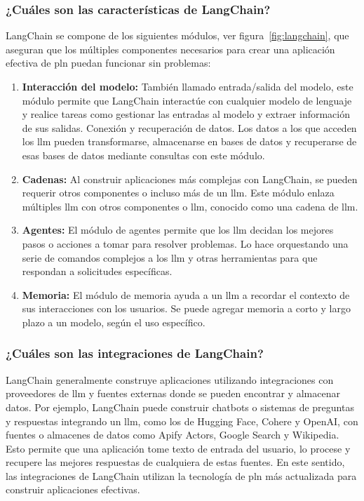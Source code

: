 \subsubsection{¿Cuáles son las características de LangChain?}
LangChain se compone de los siguientes módulos, ver figura~\ref{fig:langchain}, que aseguran que los múltiples componentes necesarios para crear una aplicación efectiva de \acrshort{pln} puedan funcionar sin problemas:
\begin{enumerate}

\item \textbf{Interacción del modelo:} También llamado entrada/salida del modelo, este módulo permite que LangChain interactúe con cualquier modelo de lenguaje y realice tareas como gestionar las entradas al modelo y extraer información de sus salidas.
Conexión y recuperación de datos. Los datos a los que acceden los \acrshort{llm} pueden transformarse, almacenarse en bases de datos y recuperarse de esas bases de datos mediante consultas con este módulo.
\item \textbf{Cadenas:} Al construir aplicaciones más complejas con LangChain, se pueden requerir otros componentes o incluso más de un \acrshort{llm}. Este módulo enlaza múltiples \acrshort{llm} con otros componentes o \acrshort{llm}, conocido como una cadena de \acrshort{llm}.
\item \textbf{Agentes:} El módulo de agentes permite que los \acrshort{llm} decidan los mejores pasos o acciones a tomar para resolver problemas. Lo hace orquestando una serie de comandos complejos a los \acrshort{llm} y otras herramientas para que respondan a solicitudes específicas.
\item \textbf{Memoria:} El módulo de memoria ayuda a un \acrshort{llm} a recordar el contexto de sus interacciones con los usuarios. Se puede agregar memoria a corto y largo plazo a un modelo, según el uso específico.
\end{enumerate}


\subsubsection{¿Cuáles son las integraciones de LangChain?}
LangChain generalmente construye aplicaciones utilizando integraciones con proveedores de \acrshort{llm} y fuentes externas donde se pueden encontrar y almacenar datos. Por ejemplo, LangChain puede construir chatbots o sistemas de preguntas y respuestas integrando un \acrshort{llm}, como los de Hugging Face, Cohere y OpenAI, con fuentes o almacenes de datos como Apify Actors, Google Search y Wikipedia. Esto permite que una aplicación tome texto de entrada del usuario, lo procese y recupere las mejores respuestas de cualquiera de estas fuentes. En este sentido, las integraciones de LangChain utilizan la tecnología de \acrlong{pln} más actualizada para construir aplicaciones efectivas.

